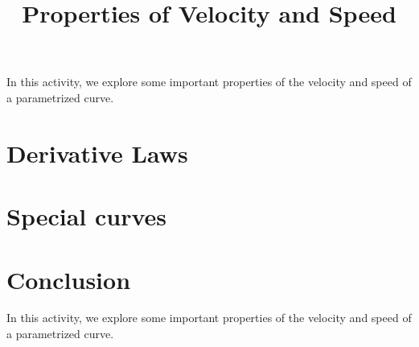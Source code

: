 \documentclass{ximera}
\title{Properties of Velocity and Speed}
\begin{document}
\begin{abstract}
\end{abstract}
\maketitle

In this activity, we explore some important properties of the velocity and speed of a parametrized curve.

\section{Derivative Laws}



\section{Special curves}



\section{Conclusion}

In this activity, we explore some important properties of the velocity and speed of a parametrized curve.
\end{document}
